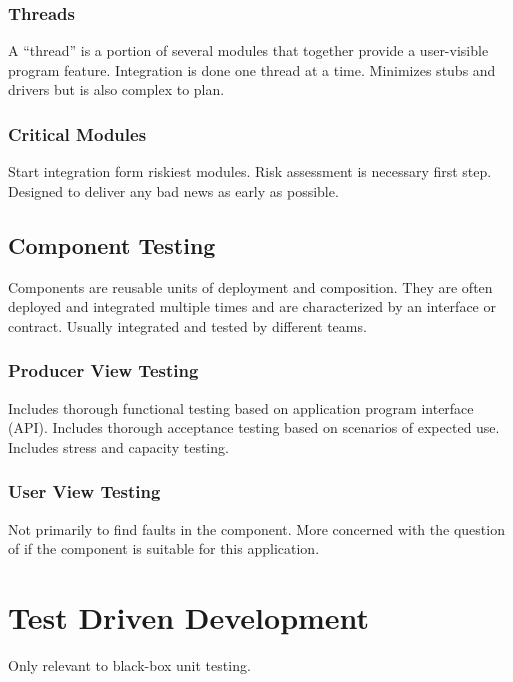 \documentclass{article}
\begin{document}
\subsubsection{Threads}
A “thread” is a portion of several modules that together provide a user-visible program feature. Integration is done one thread at a time. Minimizes stubs and drivers but is also complex to plan.

\subsubsection{Critical Modules}
Start integration form riskiest modules. Risk assessment is necessary first step. Designed to deliver any bad news as early as possible.

\subsection{Component Testing}

Components are reusable units of deployment and composition. They are often deployed and integrated multiple times and are characterized by an interface or contract. Usually integrated and tested by different teams. 

\subsubsection{Producer View Testing}
Includes thorough functional testing based on application program interface (API). Includes thorough acceptance testing based on scenarios of expected use. Includes stress and capacity testing.

\subsubsection{User View Testing}
Not primarily to find faults in the component. More concerned with the question of if the component is suitable for this application.

\section{Test Driven Development}
Only relevant to black-box unit testing.
\end{document}
